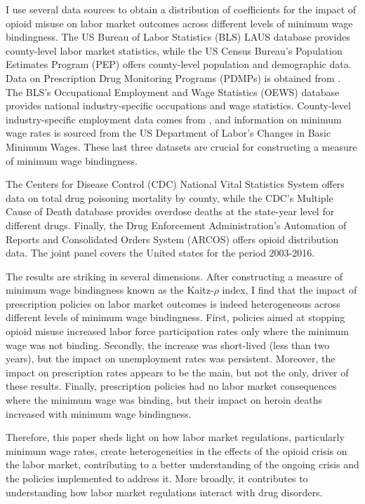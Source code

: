 \documentclass[12pt,a4paper]{article}
\begin{document}
I use several data sources to obtain a distribution of coefficients for the impact of opioid misuse on labor market outcomes across different levels of minimum wage bindingness.
The US Bureau of Labor Statistics (BLS) LAUS database provides county-level labor market statistics, while the US Census Bureau's Population Estimates Program (PEP) offers county-level population and demographic data.
Data on Prescription Drug Monitoring Programs (PDMPs) is obtained from \textcite{Horwitz2021}. 
The BLS's Occupational Employment and Wage Statistics (OEWS) database provides national industry-specific occupations and wage statistics. 
County-level industry-specific employment data comes from \textcite{Eckert2020}, and information on minimum wage rates is sourced from the US Department of Labor's Changes in Basic Minimum Wages.
These last three datasets are crucial for constructing a measure of minimum wage bindingness.

The Centers for Disease Control (CDC) National Vital Statistics System offers data on total drug poisoning mortality by county, while the CDC's Multiple Cause of Death database provides overdose deaths at the state-year level for different drugs.
Finally, the Drug Enforcement Administration's Automation of Reports and Consolidated Orders System (ARCOS) offers opioid distribution data.
The joint panel covers the United states for the period 2003-2016.

The results are striking in several dimensions.
After constructing a measure of minimum wage bindingness known as the Kaitz-\(\rho\) index, I find that the impact of prescription policies on labor market outcomes is indeed heterogeneous across different levels of minimum wage bindingness.
First, policies aimed at stopping opioid misuse increased labor force participation rates only where the minimum wage was not binding. 
Secondly, the increase was short-lived (less than two years), but the impact on unemployment rates was persistent.
Moreover, the impact on prescription rates appears to be the main, but not the only, driver of these results.
Finally, prescription policies had no labor market consequences where the minimum wage was binding, but their impact on heroin deaths increased with minimum wage bindingness.

Therefore, this paper sheds light on how labor market regulations, particularly minimum wage rates, create heterogeneities in the effects of the opioid crisis on the labor market, contributing to a better understanding of the ongoing crisis and the policies implemented to address it.
More broadly, it contributes to understanding how labor market regulations interact with drug disorders.
\end{document}
